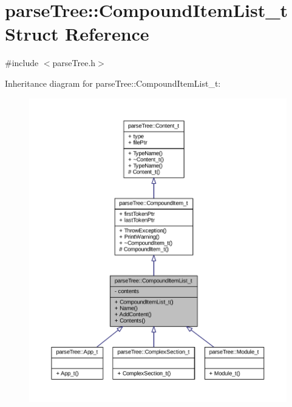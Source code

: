 \hypertarget{structparse_tree_1_1_compound_item_list__t}{}\section{parse\+Tree\+:\+:Compound\+Item\+List\+\_\+t Struct Reference}
\label{structparse_tree_1_1_compound_item_list__t}


{\ttfamily \#include $<$parse\+Tree.\+h$>$}



Inheritance diagram for parse\+Tree\+:\+:Compound\+Item\+List\+\_\+t\+:
\nopagebreak
\begin{figure}[H]
\begin{center}
\leavevmode
\includegraphics[width=350pt]{structparse_tree_1_1_compound_item_list__t__inherit__graph}
\end{center}
\end{figure}


